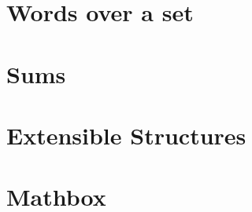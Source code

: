 \documentclass[fleqn,openany]{book}
\begin{document}
\section{Words over a set}\label{sec:words}


\section{Sums}\label{sec:sums}


\section{Extensible Structures}\label{sec:exstrut}


\section{Mathbox}




  



\printindex
\end{document}
